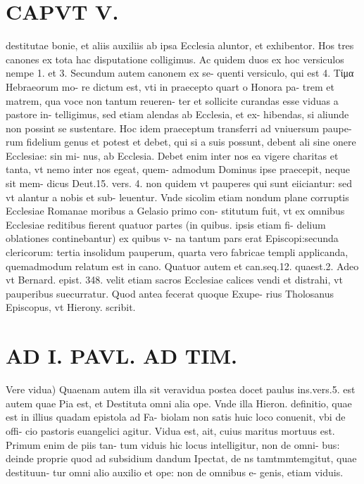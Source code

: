 \documentclass{article}
\begin{document}
\begin{pages}
\section*{CAPVT  V. }
\marginpar{[ p.83 ]}\pstart destitutae bonie, et aliis auxiliis ab ipsa Ecclesia aluntor, et exhibentor. Hos tres canones ex tota hac disputatione colligimus. Ac quidem duos ex hoc versiculos nempe 1. et 3. Secundum autem canonem ex se- quenti versiculo, qui est 4. Tίμα Hebraeorum mo- re dictum est, vti in praecepto quart o Honora pa- trem et matrem, qua voce non tantum reueren- ter et sollicite curandas esse viduas a pastore in- telligimus, sed etiam alendas ab Ecclesia, et ex- hibendas, si aliunde non possint se sustentare. Hoc idem praeceptum transferri ad vniuersum paupe- rum fidelium genus et potest et debet, qui si a suis possunt, debent ali sine onere Ecclesiae: sin mi- nus, ab Ecclesia. Debet enim inter nos ea vigere charitas et tanta, vt nemo inter nos egeat, quem- admodum Dominus ipse praecepit, neque sit mem- dicus Deut.15. vers. 4. non quidem vt pauperes qui sunt eiiciantur: sed vt alantur a nobis et sub- leuentur. Vnde sicolim etiam nondum plane corruptis Ecclesiae Romanae moribus a Gelasio primo con- stitutum fuit, vt ex omnibus Ecclesiae reditibus fierent quatuor partes (in quibus. ipsis etiam fi- delium oblationes continebantur) ex quibus v- na tantum pars erat Episcopi:secunda clericorum: tertia insolidum pauperum, quarta vero fabricae templi applicanda, quemadmodum relatum est in cano. Quatuor autem et can.seq.12. quaest.2. Adeo vt Bernard. epist. 348. velit etiam sacros Ecclesiae calices vendi et distrahi, vt pauperibus suecurratur. Quod antea fecerat quoque Exupe- rius Tholosanus Episcopus, vt Hierony. scribit.  \pend
\section*{AD I. PAVL. AD TIM. }
\marginpar{[ p.254 ]}\pstart Vere vidua) Quaenam autem illa sit veravidua postea docet paulus ins.vers.5. est autem quae Pia est, et Destituta omni alia ope. Vnde illa Hieron. definitio, quae est in illius quadam epistola ad Fa- biolam non satis huic loco conuenit, vbi de offi- cio pastoris euangelici agitur. Vidua est, ait, cuius maritus mortuus est. Primum enim de piis tan- tum viduis hic locus intelligitur, non de omni- bus: deinde proprie quod ad subsidium dandum Ipectat, de ns tamtmmtemgitut, quae destituun- tur omni alio auxilio et ope: non de omnibus e- genis, etiam viduis.  \pend\pstart {}
{}

\end{pages}
\end{document}
